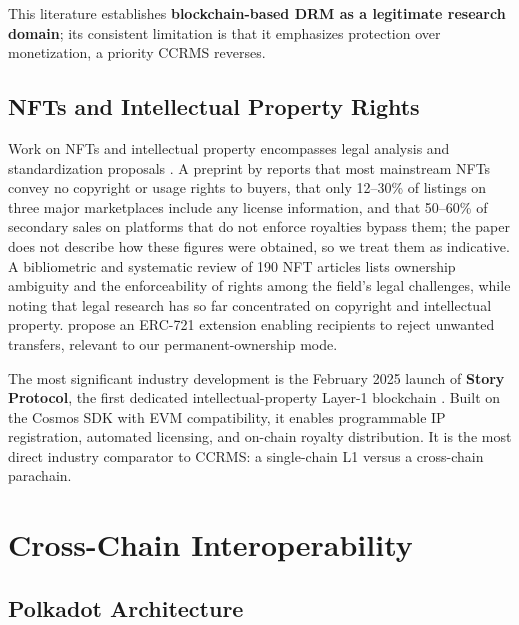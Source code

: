 This literature establishes \textbf{blockchain-based DRM as a legitimate research domain}; its consistent limitation is that it emphasizes protection over monetization, a priority CCRMS reverses.

\subsection{NFTs and Intellectual Property Rights}\label{subsec:nfts-ip-rights}

Work on NFTs and intellectual property encompasses legal analysis \citep{uspto2024, davik2025, murray2022, eurojust2024} and standardization proposals \citep{reggianini2025, gattoEtAl2021, dreyerEtAl2021}. A preprint by \citet{darshanEtAl2025} reports that most mainstream NFTs convey no copyright or usage rights to buyers, that only 12--30\% of listings on three major marketplaces include any license information, and that 50--60\% of secondary sales on platforms that do not enforce royalties bypass them; the paper does not describe how these figures were obtained, so we treat them as indicative. A bibliometric and systematic review of 190 NFT articles \citep{lahiriEtAl2026} lists ownership ambiguity and the enforceability of rights among the field's legal challenges, while noting that legal research has so far concentrated on copyright and intellectual property. \citet{cabotNadalEtAl2022} propose an ERC-721 extension enabling recipients to reject unwanted transfers, relevant to our permanent-ownership mode.

The most significant industry development is the February 2025 launch of \textbf{Story Protocol}, the first dedicated intellectual-property Layer-1 blockchain \citep{storyFoundation2025}. Built on the Cosmos SDK with EVM compatibility, it enables programmable IP registration, automated licensing, and on-chain royalty distribution. It is the most direct industry comparator to CCRMS: a single-chain L1 versus a cross-chain parachain.

\section{Cross-Chain Interoperability}\label{sec:cross-chain-interop}

\subsection{Polkadot Architecture}\label{subsec:polkadot-architecture}

